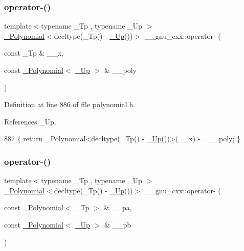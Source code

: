 \subsubsection{\texorpdfstring{operator-\/()}{operator-()}\hspace{0.1cm}{\footnotesize\ttfamily [5/6]}}
{\footnotesize\ttfamily template$<$typename \+\_\+\+Tp , typename \+\_\+\+Up $>$ \\
\hyperlink{class____gnu__cxx_1_1__Polynomial}{\+\_\+\+Polynomial}$<$decltype(\+\_\+\+Tp() -\/ \hyperlink{namespace____gnu__cxx_ab693ea357b6429b331e0bf09f9442385}{\+\_\+\+Up}())$>$ \+\_\+\+\_\+gnu\+\_\+cxx\+::operator-\/ (\begin{DoxyParamCaption}\item[{const \+\_\+\+Tp \&}]{\+\_\+\+\_\+x,  }\item[{const \hyperlink{class____gnu__cxx_1_1__Polynomial}{\+\_\+\+Polynomial}$<$ \hyperlink{namespace____gnu__cxx_ab693ea357b6429b331e0bf09f9442385}{\+\_\+\+Up} $>$ \&}]{\+\_\+\+\_\+poly }\end{DoxyParamCaption})\hspace{0.3cm}{\ttfamily [inline]}}



Definition at line 886 of file polynomial.\+h.



References \+\_\+\+Up.


\begin{DoxyCode}
887     \{ \textcolor{keywordflow}{return} \_Polynomial<decltype(\_Tp() - \hyperlink{namespace____gnu__cxx_ab693ea357b6429b331e0bf09f9442385}{\_Up}())>(\_\_x) -= \_\_poly; \}
\end{DoxyCode}
\mbox{\label{namespace____gnu__cxx_a4609eee7a71e3be3a103df9556fab9b4}} 
\subsubsection{\texorpdfstring{operator-\/()}{operator-()}\hspace{0.1cm}{\footnotesize\ttfamily [6/6]}}
{\footnotesize\ttfamily template$<$typename \+\_\+\+Tp , typename \+\_\+\+Up $>$ \\
\hyperlink{class____gnu__cxx_1_1__Polynomial}{\+\_\+\+Polynomial}$<$decltype(\+\_\+\+Tp() -\/ \hyperlink{namespace____gnu__cxx_ab693ea357b6429b331e0bf09f9442385}{\+\_\+\+Up}())$>$ \+\_\+\+\_\+gnu\+\_\+cxx\+::operator-\/ (\begin{DoxyParamCaption}\item[{const \hyperlink{class____gnu__cxx_1_1__Polynomial}{\+\_\+\+Polynomial}$<$ \+\_\+\+Tp $>$ \&}]{\+\_\+\+\_\+pa,  }\item[{const \hyperlink{class____gnu__cxx_1_1__Polynomial}{\+\_\+\+Polynomial}$<$ \hyperlink{namespace____gnu__cxx_ab693ea357b6429b331e0bf09f9442385}{\+\_\+\+Up} $>$ \&}]{\+\_\+\+\_\+pb }\end{DoxyParamCaption})\hspace{0.3cm}{\ttfamily [inline]}}

